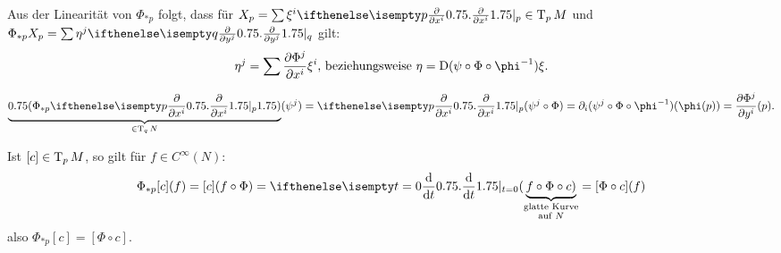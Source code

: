 \begin{bem}
  Aus der Linearität von $\Phi_{*p}$ folgt, dass für $X_p = \sum \xi^i\pdifffrac[p]{}{x^i} \in \T_pM$ und $\Phi_{*p}X_p = \sum \eta^j\pdifffrac[q]{}{y^j}$ gilt:
  \begin{align*}
    \eta^j = \sum \frac{\partial \Phi^j}{\partial x^i}\xi^i \text{, beziehungsweise } \eta = \D(\psi \circ \Phi \circ \phi^{-1})\xi.
  \end{align*}
\end{bem}

\begin{bew}
  \begin{align*}
    \underbrace{\left(\Phi_{*p}\pdifffrac[p]{}{x^i}\right)}_{\in \T_qN}(\psi^j) = \pdifffrac[p]{}{x^i}(\psi^j \circ \Phi) = \partial_i (\psi^j \circ \Phi \circ \phi^{-1})(\phi(p)) = \frac{\partial \Phi^j}{\partial y^i}(p).
  \end{align*}
\end{bew}

\begin{bem}
  Ist $[c] \in \operatorname{T}_p M$, so gilt für $f \in C^{\infty}(N)$:
  \begin{align*}
    \Phi_{*p}[c](f) = [c](f \circ \Phi) = \difffrac[t=0]{}{t}(\underbrace{f \circ \Phi \circ c)}_{\substack{\text{glatte Kurve}\\ \text{auf }N}} = [\Phi \circ c](f)
  \end{align*}
  also $\Phi_{*p}[c] = [\Phi \circ c]$.
\end{bem}


